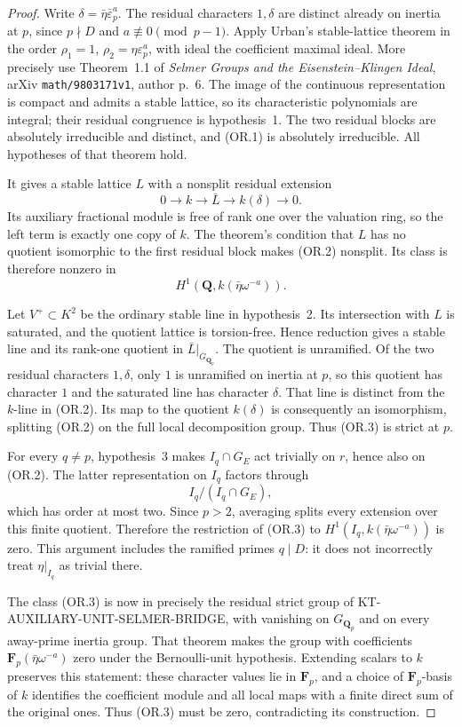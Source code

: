 \begin{proof}
Write $\delta=\bar\eta\bar\varepsilon_p^a$.
The residual characters $1,\delta$ are distinct
already on inertia at $p$, since $p\nmid D$ and
$a\not\equiv0\pmod{p-1}$.
Apply Urban's stable-lattice theorem in the order
$\rho_1=1$, $\rho_2=\eta\varepsilon_p^a$, with ideal
the coefficient maximal ideal.  More precisely use
Theorem~1.1 of \emph{Selmer Groups and the
Eisenstein--Klingen Ideal}, arXiv
\texttt{math/9803171v1}, author p.~6.
The image of the continuous representation is
compact and admits a stable lattice, so its
characteristic polynomials are integral; their
residual congruence is hypothesis~1.  The two
residual blocks are absolutely irreducible and
distinct, and (OR.1) is absolutely irreducible.
All hypotheses of that theorem hold.

It gives a stable lattice $L$ with a nonsplit
residual extension
\[
 0\longrightarrow k\longrightarrow\bar L
       \longrightarrow k(\delta)\longrightarrow0.        \tag{OR.2}
\]
Its auxiliary fractional module is free of rank
one over the valuation ring, so the left term is
exactly one copy of $k$.  The theorem's condition
that $L$ has no quotient isomorphic to the first
residual block makes (OR.2) nonsplit.  Its class is
therefore nonzero in
\[
             H^1(\mathbf Q,k(\bar\eta\omega^{-a})).       \tag{OR.3}
\]

Let $V^+\subset K^2$ be the ordinary stable line
in hypothesis~2.  Its intersection with $L$ is
saturated, and the quotient lattice is torsion-free.
Hence reduction gives a stable line and its
rank-one quotient in $\bar L|_{G_{\mathbf Q_p}}$.
The quotient is unramified.  Of the two residual
characters $1,\delta$, only $1$ is unramified on
inertia at $p$, so this quotient has character $1$
and the saturated line has character $\delta$.
That line is distinct from the $k$-line in (OR.2).
Its map to the quotient $k(\delta)$ is consequently
an isomorphism, splitting (OR.2) on the full local
decomposition group.  Thus (OR.3) is strict at $p$.

For every $q\ne p$, hypothesis~3 makes
$I_q\cap G_E$ act trivially on $r$, hence also
on (OR.2).  The latter representation on $I_q$
factors through
\[
                     I_q/(I_q\cap G_E),                 \tag{OR.4}
\]
which has order at most two.  Since $p>2$,
averaging splits every extension over this finite
quotient.  Therefore the restriction of (OR.3)
to $H^1(I_q,k(\bar\eta\omega^{-a}))$ is zero.
This argument includes the ramified primes $q\mid D$:
it does not incorrectly treat $\eta|_{I_q}$ as
trivial there.

The class (OR.3) is now in precisely the residual
strict group of KT-AUXILIARY-UNIT-SELMER-BRIDGE,
with vanishing on $G_{\mathbf Q_p}$ and on every
away-prime inertia group.  That theorem makes
the group with coefficients
$\mathbf F_p(\bar\eta\omega^{-a})$ zero under the
Bernoulli-unit hypothesis.  Extending scalars to
$k$ preserves this statement: these character
values lie in $\mathbf F_p$, and a choice of
$\mathbf F_p$-basis of $k$ identifies the coefficient
module and all local maps with a finite direct
sum of the original ones.  Thus (OR.3) must be
zero, contradicting its construction.
\end{proof}

